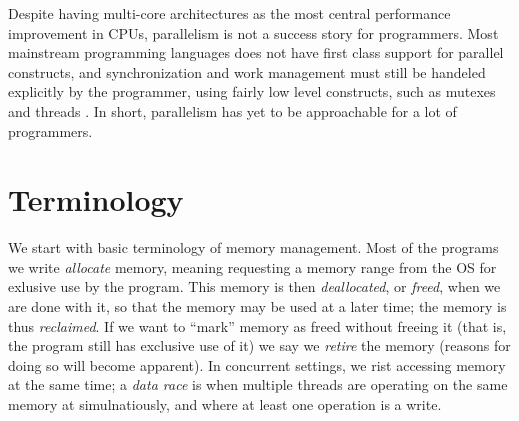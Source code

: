 \documentclass[b5paper,twoside]{report}
\begin{document}
Despite having multi-core architectures as the most central performance
improvement in CPUs, parallelism is not a success story for programmers.  Most
mainstream programming languages does not have first class support for parallel
constructs, and synchronization and work management must still be
handeled explicitly by the programmer, using fairly low level constructs, such
as mutexes and threads .
In short, parallelism has yet to be approachable for a lot of programmers.


\subsection*{}

\section{Terminology}
We start with basic terminology of memory management.  Most of the programs we
write \emph{allocate} memory, meaning requesting a memory range from the OS for
exlusive use by the program.  This memory is then \emph{deallocated}, or
\emph{freed}, when we are done with it, so that the memory may be used at a
later time; the memory is thus \emph{reclaimed}.  If we want to ``mark'' memory
as freed without freeing it (that is, the program still has exclusive use of
it) we say we \emph{retire} the memory (reasons for doing so will become
apparent).  In concurrent settings, we rist accessing memory at the same time;
a \emph{data race} is when multiple threads are operating on the same memory at
simulnatiously, and where at least one operation is a write.
\end{document}
